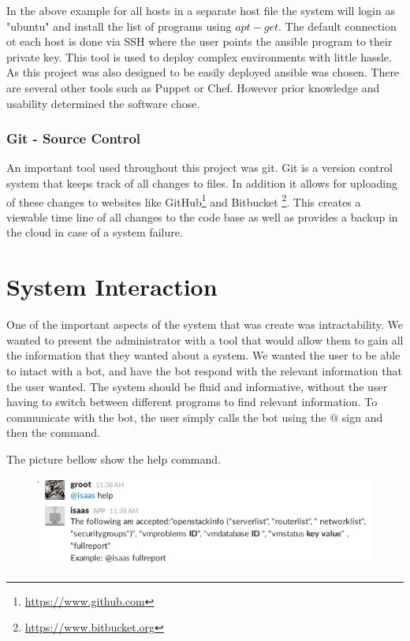 \documentclass[12pt]{article}
\begin{document}
In the above example for all hosts in a separate host file the system will login as "ubuntu" and install the list of programs using $apt-get$. The default connection ot each host is done via SSH where the user points the ansible program to their private key.  This tool is used to deploy complex environments with little hassle.  As this project was also designed to be easily deployed ansible was chosen. There are several other tools such as Puppet or Chef. However prior knowledge and usability determined the software chose. 

\subsubsection{Git - Source Control}
An important tool used throughout this project was git. Git is a version control system that keeps track of all changes to files. In addition it allows for uploading of these changes to websites like GitHub\footnote{\href{https://www.github.com}{https://www.github.com}} and Bitbucket \footnote{\href{https://www.bitbucket.org}{https://www.bitbucket.org}}. This creates a viewable time line of all changes to the code base as well as provides a backup in the cloud in case of a system failure. 

\section{System Interaction}
One of the important aspects of the system that was create was intractability. We wanted to present the administrator with a tool that would allow them to gain all the information that they wanted about a system. We wanted the user to be able to intact with a bot, and have the bot respond with the relevant information that the user wanted. The system should be fluid and informative, without the user having to switch between different programs to find relevant information. To communicate with the bot, the user simply calls the bot using the $@$ sign and then the command. 

The picture bellow show the help command. 
\begin{figure}[H]
    \begin{mdframed}
    \includegraphics[scale=.5]{./pic/2017-06-26-113851_606x161_scrot.png}
    \end{mdframed}
\end{figure}
\end{document}
